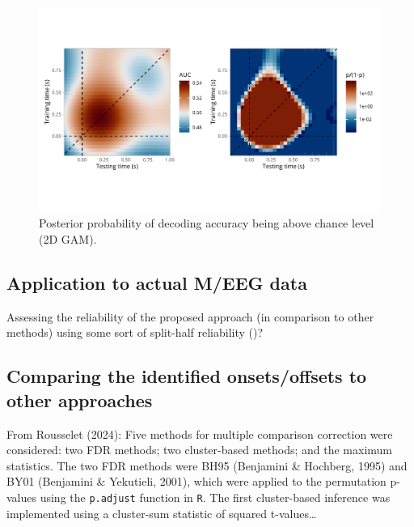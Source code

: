 \documentclass[
  doc,
  floatsintext,
  longtable,
  a4paper,
  nolmodern,
  notxfonts,
  notimes,
  colorlinks=true,linkcolor=blue,citecolor=blue,urlcolor=blue]{apa7}
\begin{document}
\begin{figure}[H]

\caption{Posterior probability of decoding accuracy being above chance
level (2D GAM).}

{\centering \includegraphics[width=1\textwidth,height=\textheight]{brms_meeg_files/figure-pdf/gam-timegen-post-preds-1.pdf}

}

\end{figure}%

\subsection{Application to actual M/EEG
data}\label{application-to-actual-meeg-data}

Assessing the reliability of the proposed approach (in comparison to
other methods) using some sort of split-half reliability
()?

\subsection{Comparing the identified onsets/offsets to other
approaches}\label{comparing-the-identified-onsetsoffsets-to-other-approaches}

From Rousselet (2024): Five methods for multiple comparison correction
were considered: two FDR methods; two cluster-based methods; and the
maximum statistics. The two FDR methods were BH95 (Benjamini \&
Hochberg, 1995) and BY01 (Benjamini \& Yekutieli, 2001), which were
applied to the permutation p-values using the \texttt{p.adjust} function
in \texttt{R}. The first cluster-based inference was implemented using a
cluster-sum statistic of squared t-values\ldots{}
\end{document}
